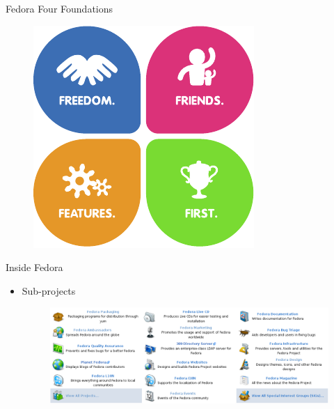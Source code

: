 \documentclass{beamer}
\begin{document}
\begin{frame}{Fedora Four Foundations}
  \begin{figure}[htbp]
    \centering
    \includegraphics[height=.7\textheight]{four_foundations.pdf}
  \end{figure}
\end{frame}

\begin{frame}{Inside Fedora}
  \begin{itemize}
    \item Sub-projects
      \begin{figure}[htbp]
        \centering
        \includegraphics[width=.9\textwidth]{subprojects.png}
      \end{figure}
  \end{itemize}
\end{frame}
\end{document}
